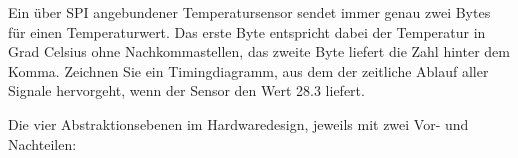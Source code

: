 \bigskip
\teilaufgabe
Ein über SPI angebundener Temperatursensor sendet immer genau zwei Bytes für
einen Temperaturwert. Das erste Byte entspricht dabei der Temperatur in Grad
Celsius ohne Nachkommastellen, das zweite Byte liefert die Zahl hinter dem Komma.
Zeichnen Sie ein Timingdiagramm, aus dem der zeitliche Ablauf aller Signale
hervorgeht, wenn der Sensor den Wert 28.3 liefert.




\clearpage
\LoesungHeader

\teilaufgabe
Die vier Abstraktionsebenen im Hardwaredesign, jeweils mit zwei Vor- und
Nachteilen:

